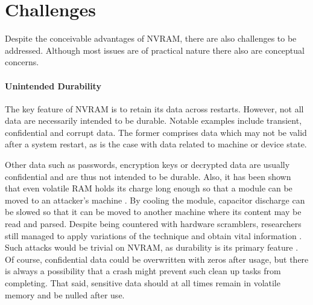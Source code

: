 

\section{Challenges}

Despite the conceivable advantages of NVRAM, there are also challenges to be
addressed. Although most issues are of practical nature there also are
conceptual concerns.

\paragraph{Unintended Durability}

The key feature of NVRAM is to retain its data across restarts. However, not all
data are necessarily intended to be durable. Notable examples include transient,
confidential and corrupt data. The former comprises data which may not be valid
after a system restart, as is the case with data related to machine or device
state.

Other data such as passwords, encryption keys or decrypted data are usually
confidential and are thus not intended to be durable. Also, it has been shown
that even volatile RAM holds its charge long enough so that a module can be
moved to an attacker's machine \cite{halderman2008lest}. By cooling the module,
capacitor discharge can be slowed so that it can be moved to another machine
where its content may be read and parsed. Despite being countered with hardware
scramblers, researchers still managed to apply variations of the technique and obtain vital information \cite{yitbarek2017cold}. Such attacks
would be trivial on NVRAM, as durability is its primary feature
\cite{bailey2011operating}. Of course, confidential data could be overwritten
with zeros after usage, but there is always a possibility that a crash might
prevent such clean up tasks from completing. That said, sensitive data should at
all times remain in volatile memory and be nulled after use.

